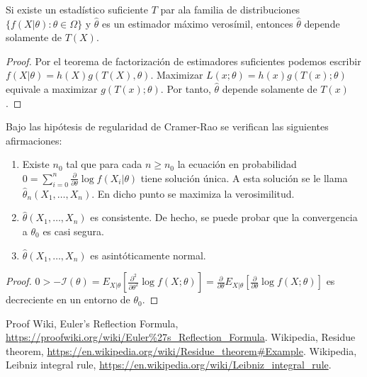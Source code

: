 \documentclass{article}
\begin{document}
    \begin{prop}
        Si existe un estadístico suficiente $T$ par ala familia de distribuciones $\{f(X|\theta): \theta \in \Omega\}$ y $\hat\theta$ es un estimador máximo verosímil, entonces $\hat\theta$ depende solamente de $T(X)$.
    \end{prop}
    \begin{proof}
        Por el teorema de factorización de estimadores suficientes podemos escribir $f(X|\theta) = h(X) g(T(X), \theta)$. Maximizar $L(x; \theta) = h(x) g(T(x); \theta)$ equivale a maximizar $g(T(x); \theta)$. Por tanto, $\hat\theta$ depende solamente de $T(x)$.
    \end{proof}

    \begin{thm}
        Bajo las hipótesis de regularidad de Cramer-Rao se verifican las siguientes afirmaciones:
        \begin{enumerate}
            \item Existe $n_0$ tal que para cada $n \ge n_0$ la ecuación en probabilidad $0 =\sum_{i=0}^n \frac{\partial}{\partial \theta} \log f(X_i | \theta)$ tiene solución única. A esta solución se le llama $\hat{\theta}_n(X_1, \ldots, X_n)$. En dicho punto se maximiza la verosimilitud.
            \item $\hat{\theta}(X_1, \ldots, X_n)$ es consistente. De hecho, se puede probar que la convergencia a $\theta_0$ es casi segura.
            \item $\hat{\theta}(X_1, \ldots, X_n)$ es asintóticamente normal.
        \end{enumerate}
    \end{thm}
    \begin{proof}
        $0 > -\mathcal{I}(\theta)=E_{X|\theta}\left[ \frac{\partial^2}{\partial\theta^2} \log f(X;\theta)\right] = \frac{\partial}{\partial\theta} E_{X|\theta} \left[ \frac{\partial}{\partial\theta} \log f(X;\theta) \right]$
        es decreciente en un entorno de $\theta_0$.
    \end{proof}

\begin{thebibliography}{99}
 Proof Wiki, Euler's Reflection Formula, \url{https://proofwiki.org/wiki/Euler%27s_Reflection_Formula}.
 Wikipedia, Residue theorem, \url{https://en.wikipedia.org/wiki/Residue_theorem#Example}.
 Wikipedia, Leibniz integral rule, \url{https://en.wikipedia.org/wiki/Leibniz_integral_rule}.
\end{thebibliography}
\end{document}
